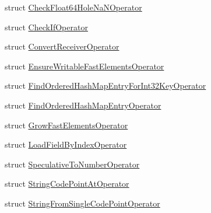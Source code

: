 \begin{DoxyCompactItemize}
\item 
struct \mbox{\hyperlink{structv8_1_1internal_1_1compiler_1_1SimplifiedOperatorGlobalCache_1_1CheckFloat64HoleNaNOperator}{Check\+Float64\+Hole\+Na\+N\+Operator}}
\item 
struct \mbox{\hyperlink{structv8_1_1internal_1_1compiler_1_1SimplifiedOperatorGlobalCache_1_1CheckIfOperator}{Check\+If\+Operator}}
\item 
struct \mbox{\hyperlink{structv8_1_1internal_1_1compiler_1_1SimplifiedOperatorGlobalCache_1_1ConvertReceiverOperator}{Convert\+Receiver\+Operator}}
\item 
struct \mbox{\hyperlink{structv8_1_1internal_1_1compiler_1_1SimplifiedOperatorGlobalCache_1_1EnsureWritableFastElementsOperator}{Ensure\+Writable\+Fast\+Elements\+Operator}}
\item 
struct \mbox{\hyperlink{structv8_1_1internal_1_1compiler_1_1SimplifiedOperatorGlobalCache_1_1FindOrderedHashMapEntryForInt32KeyOperator}{Find\+Ordered\+Hash\+Map\+Entry\+For\+Int32\+Key\+Operator}}
\item 
struct \mbox{\hyperlink{structv8_1_1internal_1_1compiler_1_1SimplifiedOperatorGlobalCache_1_1FindOrderedHashMapEntryOperator}{Find\+Ordered\+Hash\+Map\+Entry\+Operator}}
\item 
struct \mbox{\hyperlink{structv8_1_1internal_1_1compiler_1_1SimplifiedOperatorGlobalCache_1_1GrowFastElementsOperator}{Grow\+Fast\+Elements\+Operator}}
\item 
struct \mbox{\hyperlink{structv8_1_1internal_1_1compiler_1_1SimplifiedOperatorGlobalCache_1_1LoadFieldByIndexOperator}{Load\+Field\+By\+Index\+Operator}}
\item 
struct \mbox{\hyperlink{structv8_1_1internal_1_1compiler_1_1SimplifiedOperatorGlobalCache_1_1SpeculativeToNumberOperator}{Speculative\+To\+Number\+Operator}}
\item 
struct \mbox{\hyperlink{structv8_1_1internal_1_1compiler_1_1SimplifiedOperatorGlobalCache_1_1StringCodePointAtOperator}{String\+Code\+Point\+At\+Operator}}
\item 
struct \mbox{\hyperlink{structv8_1_1internal_1_1compiler_1_1SimplifiedOperatorGlobalCache_1_1StringFromSingleCodePointOperator}{String\+From\+Single\+Code\+Point\+Operator}}
\end{DoxyCompactItemize}
